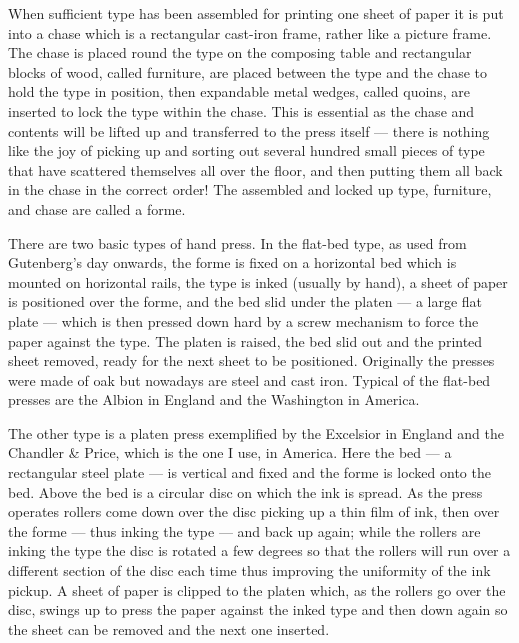 \documentclass[10pt,letterpaper,extrafontsizes]{memoir}
\newcommand{\PWnote}[2]{}
\begin{document}
    When sufficient type has been assembled for printing one sheet of paper
it is put into a chase which is a rectangular cast-iron frame, 
rather like a picture frame. The chase is placed round the type
on the composing table and rectangular
blocks of wood, called furniture, are placed between the type and the chase
to hold the type in position, then expandable metal wedges, called 
quoins,
are inserted to lock the type within the chase. This is essential as the
chase and contents will be lifted up and transferred to the press itself ---
there is nothing like the joy of picking up and sorting out several hundred
small pieces of type that have scattered themselves all over the floor, and 
then putting them all back in the chase in the correct order! The assembled
and locked up type, furniture, and chase are called a forme.

\PWnote{2009/03/29}{Revised description of composing type and added paras 
        about kinds of hand presses}
    There are two basic types of hand press. In the 
flat-bed type, as 
used from Gutenberg's day onwards, the forme is fixed on a horizontal bed
which is mounted on horizontal rails, the type is inked (usually by hand), 
a sheet of paper is positioned over the forme, and the bed
slid under the platen --- a large flat plate --- which is then pressed
down hard by a screw mechanism to force the paper against the type. The platen 
is raised, the bed slid out and the printed sheet removed, ready for the next
sheet to be positioned. Originally the presses were made of oak but
nowadays are steel and cast iron. Typical of
the flat-bed presses are the  Albion in England 
and the Washington in America.

    The other type is a platen press 
exemplified by the Excelsior in England 
and the Chandler \& Price, which 
is the one I use, in America. Here the bed --- a rectangular steel plate ---
is vertical and fixed and the forme is locked onto the bed. Above the bed
is a circular disc on which the ink is spread. As the press operates rollers
come down over the disc picking up a thin film of ink, 
then over the forme --- thus inking the type ---
and back up again; while the rollers are inking the type the disc is
rotated a few degrees so that the rollers will run over a different section 
of the disc each time thus improving the uniformity of the ink pickup. 
A sheet of paper is clipped to the platen which, as the 
rollers go over the disc, swings up to press the paper against the inked type
and then down again so the sheet can be removed and the next one inserted.
\end{document}
